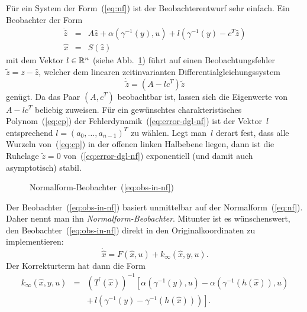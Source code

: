 Für ein System der Form~(\ref{eq:nf}) ist der Beobachterentwurf
sehr einfach. Ein Beobachter der Form 
\begin{equation}
\begin{array}{ccl}
\dot{\hat{z}} & = & A\hat{z}+\alpha(\gamma^{-1}(y),u)+l(\gamma^{-1}(y)-c^{T}\hat{z})\\
\hat{x} & = & S(\hat{z})
\end{array}\label{eq:obs-in-nf}
\end{equation}
mit dem Vektor $l\in{\mathbb{R}}^{n}$ (siehe Abb.~\ref{fig:Normalform-Beobachter})
führt auf einen Beobachtungsfehler $\tilde{z}=z-\hat{z}$, welcher
dem linearen zeit\-invarianten Differential\-gleichungs\-system
\begin{equation}
\dot{\tilde{z}}=(A-lc^{T})\tilde{z}\label{eq:error-dgl-nf}
\end{equation}
genügt. Da das Paar $(A,c^{T})$ beobachtbar ist, lassen sich die
Eigenwerte von $A-lc^{T}$ beliebig zuweisen. Für ein gewünschtes
charakteristisches Polynom~(\ref{eq:cp}) der Fehlerdynamik~(\ref{eq:error-dgl-nf})
ist der Vektor~$l$ entsprechend $l=(a_{0},\ldots,a_{n-1})^{T}$
zu wählen. Legt man~$l$ derart fest, dass alle Wurzeln von~(\ref{eq:cp})
in der offenen linken Halbebene liegen, dann ist die Ruhelage $\tilde{z}=0$
von~(\ref{eq:error-dgl-nf}) exponentiell (und damit auch asymptotisch)
stabil. 

\begin{figure}
\begin{centering}
\resizebox{0.85\textwidth}{!}{}
\par\end{centering}
\caption{Normalform-Beobachter~(\ref{eq:obs-in-nf})\label{fig:Normalform-Beobachter}}
\end{figure}

Der Beobachter~(\ref{eq:obs-in-nf}) basiert unmittelbar auf der
Normalform~(\ref{eq:nf}). Daher nennt man ihn \emph{Normalform-Beobachter}.
Mitunter ist es wünschenswert, den Beobachter~(\ref{eq:obs-in-nf})
direkt in den Originalkoordinaten zu implementieren:
\begin{equation}
\dot{\hat{x}}=F(\hat{x},u)+k_{\infty}(\hat{x},y,u).\label{eq:ons-orig}
\end{equation}
Der Korrekturterm hat dann die Form 
\begin{equation}
\begin{array}{ccl}
k_{\infty}(\hat{x},y,u) & = & \left(T^{\prime}(\hat{x})\right)^{-1}\left[\alpha(\gamma^{-1}(y),u)-\alpha(\gamma^{-1}(h(\hat{x})),u)\right.\\
 &  & \left.+\,l(\gamma^{-1}(y)-\gamma^{-1}(h(\hat{x})))\right].
\end{array}\label{eq:correction-term-nf-obs}
\end{equation}

